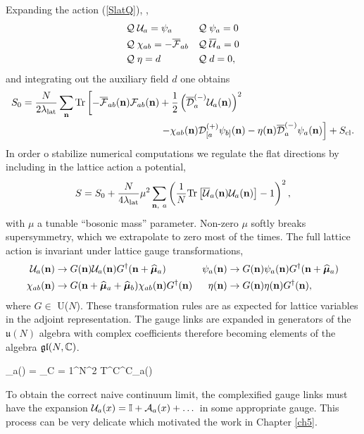 Expanding the action (\ref{SlatQ}), ,
\begin{align}
  & \mathcal Q\; \mathcal U_a = \psi_a          & & \mathcal Q\; \psi_a = 0 \nonumber \\
  & \mathcal Q\; \chi_{ab} = -{\overline{\cal F}}_{ab}  & & \mathcal Q\; {\overline{\cal U}}_a = 0 \label{BRSTlatticesymmetry} \\
  & \mathcal Q\; \eta = d                & & \mathcal Q\; d = 0, \nonumber
\end{align}
and integrating out the auxiliary field $d$ one obtains
\begin{equation}
  \label{eq:lat_act}
  \begin{split}
    S_0 & = \frac{N}{2\lambda_{\rm lat}} \sum_{\mathbf{n}} \mbox{Tr}\left[-{\overline{\cal F}}_{ab}(\mathbf{n}) {\cal F}_{ab}(\mathbf{n}) + \frac{1}{2}\left({\overline{\cal D}}_a^{(-)}\mathcal U_a(\mathbf{n})\right)^2 \right. \\
        & \qquad\qquad\qquad\qquad\qquad\qquad\qquad \left. - \chi_{ab}(\mathbf{n}) \mathcal D^{(+)}_{[a}\psi_{b]}(\mathbf{n}) - \eta(\mathbf{n}) {\overline{\cal D}}^{(-)}_a\psi_a(\mathbf{n})\right] + S_{\rm cl}.
  \end{split}
\end{equation}
In order o stabilize numerical computations we regulate the flat directions by
 including in the lattice action a potential, 
\begin{equation}
  \label{eq:mass}
  S = S_0 + \frac{N}{4\lambda_{\rm lat}} \mu^2 \sum_{\mathbf{n},\ a} \left(\frac{1}{N}\mbox{Tr}\left[{\overline{\cal U}}_a(\mathbf{n}) \mathcal U_a(\mathbf{n})\right] - 1\right)^2,
\end{equation}
with $\mu$ a tunable ``bosonic mass'' parameter.
Non-zero $\mu$ softly breaks supersymmetry, which we extrapolate to zero 
most of the times. 
The full lattice action is invariant under lattice gauge transformations,
\begin{align}
  \mathcal U_a(\mathbf{n}) & \to G(\mathbf{n})\mathcal U_a(\mathbf{n})G^{\dag}(\mathbf{n}+\widehat{\boldsymbol{\mu}}_a)                   &
  \psi_a(\mathbf{n}) & \to G(\mathbf{n})\psi_a(\mathbf{n})G^{\dag}(\mathbf{n}+\widehat{\boldsymbol{\mu}}_a)                 \\
  \chi_{ab}(\mathbf{n}) & \to G(\mathbf{n}+\widehat{\boldsymbol{\mu}}_a+\widehat{\boldsymbol{\mu}}_b)\chi_{ab}(\mathbf{n})G^{\dag}(\mathbf{n}) &
  \eta(\mathbf{n}) & \to G(\mathbf{n})\eta(\mathbf{n})G^{\dag}(\mathbf{n}),                              \nonumber
\end{align}
where $G \in$ U($N$).
These transformation rules are as expected for lattice variables in the adjoint representation.
The gauge links are expanded in generators of the $\mathfrak u(N)$ algebra with complex coefficients
therefore becoming elements of the algebra $\mathfrak{gl}(N, \mathbb C)$.

\beq
  \cU_a(\vn) = \sum_{C = 1}^{N^2} T^C\cU^C_a(\vn)
\eeq

To obtain the correct naive continuum limit, the complexified gauge links must have the 
expansion $\mathcal U_a(x) = \mathbb I + \mathcal A_a(x) + \dots$ in some appropriate gauge. This process can be 
very delicate which motivated the work in Chapter \ref{ch5}. 


